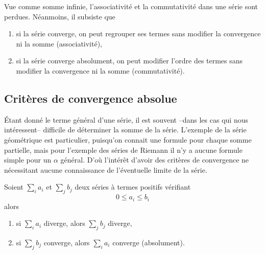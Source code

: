 \begin{remark}
    Vue comme somme infinie, l'associativité et la commutativité dans une série sont perdues. Néanmoins, il subsiste que
  \begin{enumerate}
  \item 
      si la série converge, on peut regrouper ses termes sans modifier la convergence ni la somme (associativité),
  \item
      si la série converge absolument, on peut modifier l'ordre des termes sans modifier la convergence ni la somme (commutativité).
  \end{enumerate}
\end{remark}

\subsection{Critères de convergence absolue}

Étant donné le terme général d'une série, il est souvent --dans les cas qui nous intéressent-- difficile de déterminer la somme de la série. L'exemple de la série géométrique est particulier, puisqu'on connait une formule pour chaque somme partielle, mais pour l'exemple des séries de Riemann il n'y a aucune formule simple pour un $\alpha$ général. D'où l'intérêt d'avoir des critères de convergence ne nécessitant aucune connaissance de l'éventuelle limite de la série.

\begin{lemma}   \label{LemgHWyfG}
Soient $\sum_i a_i$ et $\sum_j
b_j$ deux séries à termes positifs vérifiant
\begin{equation*}
  0 \leq a_i \leq b_i
\end{equation*}
alors
\begin{enumerate}
\item si $\sum_i a_i$ diverge, alors $\sum_j b_j$ diverge,
\item si $\sum_j b_j$ converge, alors $\sum_i a_i$ converge
  (absolument).
  \end{enumerate}
\end{lemma}


